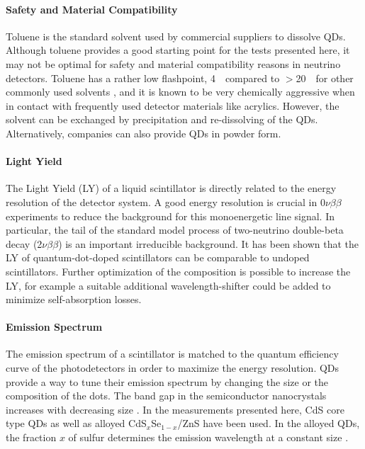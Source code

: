 \documentclass[cits]{JINST}
\begin{document}
\paragraph{Safety and Material Compatibility}
Toluene is the standard solvent used by commercial suppliers to dissolve QDs. Although toluene provides a good starting point for the tests presented here, it may not be optimal for safety and material compatibility reasons in neutrino detectors. Toluene has a rather low flashpoint, 4~\textcelsius~compared to $>$20~\textcelsius~for other commonly used solvents \cite{yeh2007}, and it is known to be very chemically aggressive when in contact with frequently used detector materials like acrylics. However, the solvent can be exchanged by precipitation and re-dissolving of the QDs. Alternatively, companies can also provide QDs in powder form. 

\paragraph{Light Yield} 
The Light Yield (LY) of a liquid scintillator is directly related to the energy resolution of the detector system. A good energy resolution is crucial in 0$\nu\beta\beta$ experiments to reduce the background for this monoenergetic line signal. In particular, the tail of the standard model process of two-neutrino double-beta decay (2$\nu\beta\beta$) is an important irreducible background. It has been shown that the LY of quantum-dot-doped scintillators can be comparable to undoped scintillators\cite{mitpaper}. Further optimization of the composition is possible to increase the LY, for example a suitable additional wavelength-shifter could be added to minimize self-absorption losses.

\paragraph{Emission Spectrum}
The emission spectrum of a scintillator is matched to the quantum efficiency curve of the photodetectors in order to maximize the energy resolution. QDs provide a way to tune their emission spectrum by changing the size or the composition of the dots. The band gap in the semiconductor nanocrystals increases with decreasing size \cite{alivisatos1996}. In the measurements presented here, CdS core type QDs as well as alloyed CdS$_x$Se$_{1-x}$/ZnS have been used. In the alloyed QDs, the fraction $x$ of sulfur determines the emission wavelength at a constant size \cite{swafford2006}. 
\end{document}
